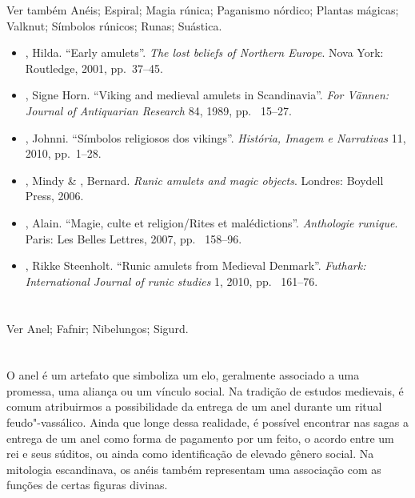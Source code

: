 Ver também Anéis; Espiral; Magia rúnica; Paganismo nórdico; Plantas
mágicas; Valknut; Símbolos rúnicos; Runas; Suástica.



\begin{itemize}\footnotesize
\item
  , Hilda. ``Early amulets''. \emph{The lost beliefs of Northern
  Europe}. Nova York: Routledge, 2001, pp.~37--45.
\item
  , Signe Horn. ``Viking and medieval amulets in Scandinavia''.
  \emph{For Vännen: Journal of Antiquarian Research} 84, 1989, pp.~ 15--27.
\item
  , Johnni. ``Símbolos religiosos dos vikings''. \emph{História,
  Imagem e Narrativas} 11, 2010, pp.~1--28.
\item
  , Mindy \& , Bernard. \emph{Runic amulets and magic
  objects}. Londres: Boydell Press, 2006.
\item
  , Alain. ``Magie, culte et religion/Rites et malédictions''.
  \emph{Anthologie runique}. Paris: Les Belles Lettres, 2007, pp.~ 158--96.
\item
  , Rikke Steenholt. ``Runic amulets from Medieval Denmark''.
  \emph{Futhark: International Journal of runic studies} 1, 2010, pp.~ 161--76.
\end{itemize}

\section{}

Ver Anel; Fafnir; Nibelungos; Sigurd.

\section{}

O anel é um artefato que simboliza um elo, geralmente associado a uma
promessa, uma aliança ou um vínculo social. Na tradição de estudos
medievais, é comum atribuirmos a possibilidade da entrega de um anel
durante um ritual feudo"-vassálico. Ainda que longe dessa realidade, é
possível encontrar nas sagas a entrega de um anel como forma de
pagamento por um feito, o acordo entre um rei e seus súditos, ou ainda
como identificação de elevado gênero social. Na mitologia escandinava,
os anéis também representam uma associação com as funções de certas
figuras divinas.

